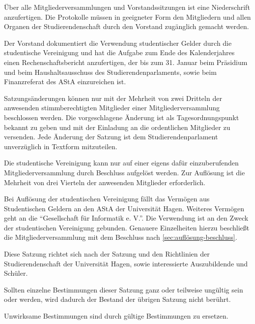 \begin{contract}
\label{sec:niederschrift}

Über alle Mitgliederversammlungen und Vorstandssitzungen ist eine Niederschrift anzufertigen. Die Protokolle müssen in geeigneter Form den Mitgliedern und allen Organen der Studierendenschaft durch den Vorstand zugänglich gemacht werden.


\label{sec:rechenschaftsbericht}

Der Vorstand dokumentiert die Verwendung studentischer Gelder durch die studentische Vereinigung und hat die Aufgabe zum Ende des Kalenderjahres einen Rechenschaftsbericht anzufertigen, der bis zum 31. Januar beim Präsidium und beim Haushaltsausschuss des Studierendenparlaments, sowie beim Finanzreferat des AStA einzureichen ist.


\label{sec:satzungsänderung}

Satzungsänderungen können nur mit der Mehrheit von zwei Dritteln der anwesenden stimmberechtigten Mitglieder einer Mitgliederversammlung beschlossen werden. Die vorgeschlagene Änderung ist als Tagesordnungspunkt bekannt zu geben und mit der Einladung an die ordentlichen Mitglieder zu versenden. Jede Änderung der Satzung ist dem Studierendenparlament unverzüglich in Textform  mitzuteilen.


\label{sec:auflösung}

Die studentische Vereinigung kann nur auf einer eigens dafür einzuberufenden Mitgliederversammlung durch Beschluss aufgelöst werden. Zur Auflösung ist die Mehrheit von drei Vierteln der anwesenden Mitglieder erforderlich. \label{sec:auflösung-beschluss}

Bei Auflösung der studentischen Vereinigung fällt das Vermögen aus Studentischen Geldern an den AStA der Universität Hagen.  Weiteres Vermögen geht an die ``Gesellschaft für Informatik e. V.''. Die Verwendung ist an den Zweck der studentischen Vereinigung gebunden. Genauere Einzelheiten hierzu beschließt die Mitgliederversammlung mit dem Beschluss nach \ref{sec:auflösung-beschluss}.



Diese Satzung richtet sich nach der Satzung und den Richtlinien der Studierendenschaft der Universität Hagen, sowie interessierte Auszubildende und Schüler.

Sollten einzelne Bestimmungen dieser Satzung ganz oder teilweise ungültig sein oder werden, wird dadurch der Bestand der übrigen Satzung nicht berührt.

Unwirksame Bestimmungen sind durch gültige Bestimmungen zu ersetzen.



\end{contract}

